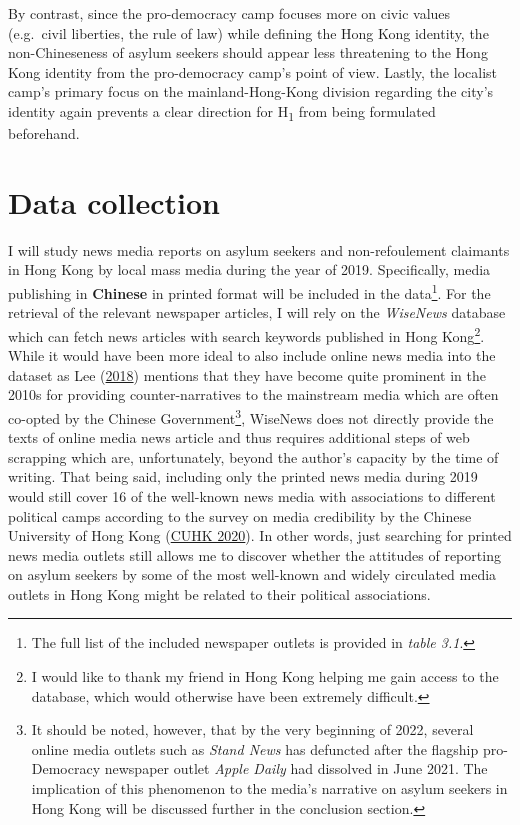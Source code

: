 \documentclass[a4paper, oneside]{report}
\begin{document}
By contrast, since the pro-democracy camp focuses more on civic values
(e.g.~civil liberties, the rule of law) while defining the Hong Kong
identity, the non-Chineseness of asylum seekers should appear less
threatening to the Hong Kong identity from the pro-democracy camp's
point of view. Lastly, the localist camp's primary focus on the
mainland-Hong-Kong division regarding the city's identity again prevents
a clear direction for H\textsubscript{1} from being formulated
beforehand.

\hypertarget{data-collection}{%
\section{Data collection}\label{data-collection}}

I will study news media reports on asylum seekers and non-refoulement
claimants in Hong Kong by local mass media during the year of 2019.
Specifically, media publishing in \textbf{Chinese} in printed format
will be included in the data\footnote{The full list of the included
  newspaper outlets is provided in \emph{table 3.1}.}. For the retrieval
of the relevant newspaper articles, I will rely on the \emph{WiseNews}
database which can fetch news articles with search keywords published in
Hong Kong\footnote{I would like to thank my friend in Hong Kong helping
  me gain access to the database, which would otherwise have been
  extremely difficult.}. While it would have been more ideal to also
include online news media into the dataset as Lee
(\protect\hyperlink{ref-leeChangingPoliticalEconomy2018}{2018}) mentions
that they have become quite prominent in the 2010s for providing
counter-narratives to the mainstream media which are often co-opted by
the Chinese Government\footnote{It should be noted, however, that by the
  very beginning of 2022, several online media outlets such as
  \emph{Stand News} has defuncted after the flagship pro-Democracy
  newspaper outlet \emph{Apple Daily} had dissolved in June 2021. The
  implication of this phenomenon to the media's narrative on asylum
  seekers in Hong Kong will be discussed further in the conclusion
  section.}, WiseNews does not directly provide the texts of online
media news article and thus requires additional steps of web scrapping
which are, unfortunately, beyond the author's capacity by the time of
writing. That being said, including only the printed news media during
2019 would still cover 16 of the well-known news media with associations
to different political camps according to the survey on media
credibility by the Chinese University of Hong Kong
(\protect\hyperlink{ref-cuhkPublicEvaluationMedia2020}{CUHK 2020}). In
other words, just searching for printed news media outlets still allows
me to discover whether the attitudes of reporting on asylum seekers by
some of the most well-known and widely circulated media outlets in Hong
Kong might be related to their political associations.
\end{document}
